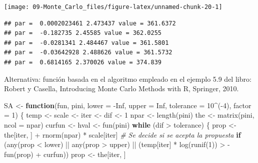 \documentclass[
]{book}
\newenvironment{Shaded}{\begin{snugshade}}{\end{snugshade}}
\newcommand{\AttributeTok}[1]{\textcolor[rgb]{0.77,0.63,0.00}{#1}}
\newcommand{\CommentTok}[1]{\textcolor[rgb]{0.56,0.35,0.01}{\textit{#1}}}
\newcommand{\ConstantTok}[1]{\textcolor[rgb]{0.00,0.00,0.00}{#1}}
\newcommand{\ControlFlowTok}[1]{\textcolor[rgb]{0.13,0.29,0.53}{\textbf{#1}}}
\newcommand{\DecValTok}[1]{\textcolor[rgb]{0.00,0.00,0.81}{#1}}
\newcommand{\FunctionTok}[1]{\textcolor[rgb]{0.00,0.00,0.00}{#1}}
\newcommand{\NormalTok}[1]{#1}
\newcommand{\OtherTok}[1]{\textcolor[rgb]{0.56,0.35,0.01}{#1}}
\newcommand{\SpecialCharTok}[1]{\textcolor[rgb]{0.00,0.00,0.00}{#1}}
\theoremstyle{break}
\theoremstyle{definition}
\theoremstyle{definition}
\theoremstyle{definition}
\theoremstyle{definition}
\theoremstyle{remark}
\begin{document}
\begin{center}\texttt{[image: 09-Monte\_Carlo\_files/figure-latex/unnamed-chunk-20-1]} \end{center}

\begin{verbatim}
## par =  0.0002023461 2.473437 value = 361.6372 
## par =  -0.182735 2.45585 value = 362.0255 
## par =  -0.0281341 2.484467 value = 361.5801 
## par =  -0.03642928 2.488626 value = 361.5732 
## par =  0.6814165 2.370026 value = 374.839
\end{verbatim}

Alternativa: función basada en el algoritmo empleado en el ejemplo 5.9 del libro:
Robert y Casella, Introducing Monte Carlo Methods with R, Springer, 2010.

\begin{Shaded}
\begin{Highlighting}[]
\NormalTok{SA }\OtherTok{\textless{}{-}} \ControlFlowTok{function}\NormalTok{(fun, pini, }\AttributeTok{lower =} \SpecialCharTok{{-}}\ConstantTok{Inf}\NormalTok{, }\AttributeTok{upper =} \ConstantTok{Inf}\NormalTok{, }\AttributeTok{tolerance =} \DecValTok{10}\SpecialCharTok{\^{}}\NormalTok{(}\SpecialCharTok{{-}}\DecValTok{4}\NormalTok{), }\AttributeTok{factor =} \DecValTok{1}\NormalTok{) \{}
\NormalTok{  temp }\OtherTok{\textless{}{-}}\NormalTok{ scale }\OtherTok{\textless{}{-}}\NormalTok{ iter }\OtherTok{\textless{}{-}}\NormalTok{ dif }\OtherTok{\textless{}{-}} \DecValTok{1}
\NormalTok{  npar }\OtherTok{\textless{}{-}} \FunctionTok{length}\NormalTok{(pini) }
\NormalTok{  the }\OtherTok{\textless{}{-}} \FunctionTok{matrix}\NormalTok{(pini, }\AttributeTok{ncol =}\NormalTok{ npar)}
\NormalTok{  curfun }\OtherTok{\textless{}{-}}\NormalTok{ hval }\OtherTok{\textless{}{-}} \FunctionTok{fun}\NormalTok{(pini)}
  \ControlFlowTok{while}\NormalTok{ (dif }\SpecialCharTok{\textgreater{}}\NormalTok{ tolerance) \{}
\NormalTok{    prop }\OtherTok{\textless{}{-}}\NormalTok{ the[iter, ] }\SpecialCharTok{+} \FunctionTok{rnorm}\NormalTok{(npar) }\SpecialCharTok{*}\NormalTok{ scale[iter]}
    \CommentTok{\# Se decide si se acepta la propuesta}
    \ControlFlowTok{if}\NormalTok{ (}\FunctionTok{any}\NormalTok{(prop }\SpecialCharTok{\textless{}}\NormalTok{ lower) }\SpecialCharTok{||} \FunctionTok{any}\NormalTok{(prop }\SpecialCharTok{\textgreater{}}\NormalTok{ upper) }\SpecialCharTok{||} 
\NormalTok{        (temp[iter] }\SpecialCharTok{*} \FunctionTok{log}\NormalTok{(}\FunctionTok{runif}\NormalTok{(}\DecValTok{1}\NormalTok{)) }\SpecialCharTok{\textgreater{}} \SpecialCharTok{{-}}\FunctionTok{fun}\NormalTok{(prop) }\SpecialCharTok{+}\NormalTok{ curfun))  prop }\OtherTok{\textless{}{-}}\NormalTok{ the[iter, ]}

\end{Highlighting}
\end{Shaded}
\end{document}
